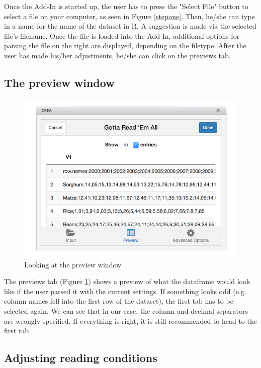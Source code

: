 \documentclass[12pt]{article} %
\begin{document}
Once the Add-In is started up, the user has to press the "Select File" button to select a file on your computer, as seen in Figure \ref{stepone}. Then, he/she can type in a name for the name of the dataset in R. A suggestion is made via the selected file's filename. Once the file is loaded into the Add-In, additional options for parsing the file on the right are displayed, depending on the filetype. After the user has made his/her adjustments, he/she can click on the previews tab.

\subsection{The preview window}

\begin{figure}
\center
\includegraphics{figures/step2.png}
\caption{Looking at the preview window}
\label{steptwo}
\end{figure}

The previews tab (Figure \ref{steptwo}) shows a preview of what the dataframe would look like if the user parsed it with the current settings. If something looks odd (e.g. column names fell into the first row of the dataset), the first tab has to be selected again. We can see that in our case, the column and decimal separators are wrongly specified. If everything is right, it is still recommended to head to the first tab.

\subsection{Adjusting reading conditions}
\end{document}
